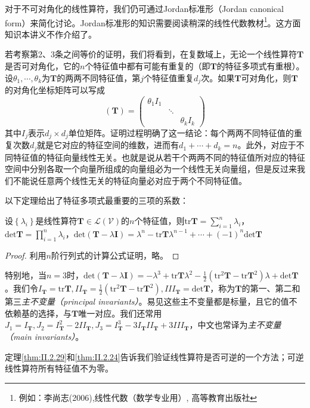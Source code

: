 \documentclass[../main.tex]{subfiles}
\begin{document}
对于不可对角化的线性算符，我们仍可通过Jordan标准形（Jordan canonical form）来简化讨论。Jordan标准形的知识需要阅读稍深的线性代数教材\footnote{例如：李尚志(2006),线性代数（数学专业用）, 高等教育出版社}。这方面知识本讲义不作介绍了。

若考察第2、3条之间等价的证明，我们将看到，在复数域上，无论一个线性算符$\mathbf{T}$是否可对角化，它的$n$个特征值中都有可能有重复的（即$\mathbf{T}$的特征多项式有重根）。设$\theta_1,\cdots,\theta_k$为$\mathbf{T}$的两两不同特征值，第$j$个特征值重复$d_j$次。如果$\mathbf{T}$可对角化，则$\mathbf{T}$的对角化坐标矩阵可以写成
\[\left(\mathbf{T}\right)=\left(\begin{array}{ccc}\theta_1I_1&&\\&\ddots&\\&&\theta_kI_k\end{array}\right)\]
其中$I_j$表示$d_j\times d_j$单位矩阵。证明过程明确了这一结论：每个两两不同特征值的重复次数$d_j$就是它对应的特征空间的维数，进而有$d_1+\cdots+d_k=n$。此外，对应于不同特征值的特征向量线性无关。也就是说从若干个两两不同的特征值所对应的特征空间中分别各取一个向量所组成的向量组必为一个线性无关向量组\cite[\S 5.1 性质1.4]{周胜林2012线性代数}，但是反过来我们不能说任意两个线性无关的特征向量必对应于两个不同特征值。

以下定理\cite[\S 5.1 性质1.1、1.2]{周胜林2012线性代数}给出了特征多项式最重要的三项的系数：

\begin{theorem}\label{thm:II.2.29}
    设$\left\{\lambda_i\right\}$是线性算符$\mathbf{T}\in\mathcal{L}\left(\mathcal{V}\right)$的$n$个特征值，则$\mathrm{tr}\mathbf{T}=\sum_{i=1}^n\lambda_i$，$\mathrm{det}\mathbf{T}=\prod_{i=1}^n\lambda_i$，$\mathrm{det}\left(\mathbf{T}-\lambda\mathbf{I}\right)=\lambda^n-\mathrm{tr}\mathbf{T}\lambda^{n-1}+\cdots+\left(-1\right)^n\mathrm{det}\mathbf{T}$
\end{theorem}
\begin{proof}
    利用$n$阶行列式的计算公式证明，略。
\end{proof}

特别地，当$n=3$时，$\mathrm{det}\left(\mathbf{T}-\lambda\mathbf{I}\right)=-\lambda^3+\mathrm{tr}\mathbf{T}\lambda^2-\frac{1}{2}\left(\mathrm{tr}^2\mathbf{T}-\mathrm{tr}\mathbf{T}^2\right)\lambda+\mathrm{det}\mathbf{T}$。我们令$I_\mathbf{T}=\mathrm{tr}\mathbf{T},II_\mathbf{T}=\frac{1}{2}\left(\mathrm{tr}^2\mathbf{T}-\mathrm{tr}\mathbf{T}^2\right),III_\mathbf{T}=\mathrm{det}\mathbf{T}$，称为$\mathbf{T}$的第一、第二和第三\emph{主不变量（principal invariants）}。易见这些主不变量都是标量，且它的值不依赖基的选择，与$\mathbf{T}$唯一对应。我们还常用$J_1=I_\mathbf{T},J_2=I_\mathbf{T}^2-2II_\mathbf{T},J_3=I_\mathbf{T}^3-3I_\mathbf{T}II_\mathbf{T}+3III_\mathbf{T}$，中文也常译为\emph{主不变量（main invariants）}。

定理\ref{thm:II.2.29}和\ref{thm:II.2.24}告诉我们验证线性算符是否可逆的一个方法；可逆线性算符所有特征值不为零。
\end{document}
